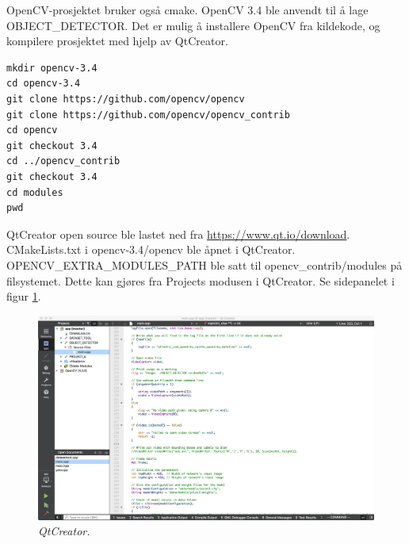 OpenCV-prosjektet bruker også cmake. OpenCV 3.4 ble anvendt til å lage OBJECT\_DETECTOR. Det er mulig å installere OpenCV fra kildekode, og kompilere prosjektet med hjelp av QtCreator.

\begin{verbatim}
mkdir opencv-3.4
cd opencv-3.4
git clone https://github.com/opencv/opencv
git clone https://github.com/opencv/opencv_contrib
cd opencv
git checkout 3.4
cd ../opencv_contrib
git checkout 3.4
cd modules
pwd
\end{verbatim}

QtCreator open source ble lastet ned fra \url{https://www.qt.io/download}. CMakeLists.txt i opencv-3.4/opencv ble åpnet i QtCreator. OPENCV\_EXTRA\_MODULES\_PATH ble satt til opencv\_contrib/modules på filsystemet. Dette kan gjøres fra Projects modusen i QtCreator. Se sidepanelet i figur \ref{fig:qtcreator}.

\begin{figure}
\begin{center} 
\includegraphics[scale=0.2]{figures/qtcreator}
\caption{\small \sl QtCreator. \label{fig:qtcreator}} 
\end{center} 
\end{figure} 

